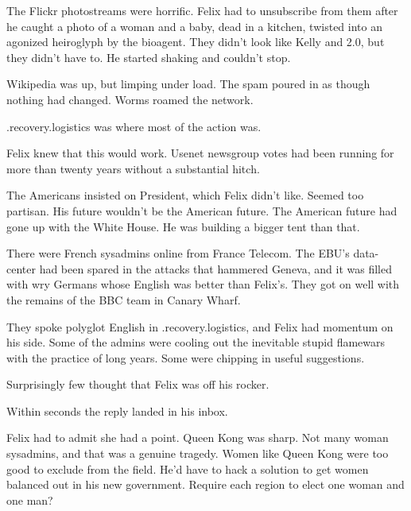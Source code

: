 The Flickr photostreams were horrific. Felix had to unsubscribe
from them after he caught a photo of a woman and a baby, dead in a
kitchen, twisted into an agonized heiroglyph by the bioagent. They
didn’t look like Kelly and 2.0, but they didn’t have to. He started
shaking and couldn’t stop.

Wikipedia was up, but limping under load. The spam poured in as
though nothing had changed. Worms roamed the network.

.recovery.logistics was where most of the action was.

Felix knew that this would work. Usenet newsgroup votes had been
running for more than twenty years without a substantial hitch.

The Americans insisted on President, which Felix didn’t like.
Seemed too partisan. His future wouldn’t be the American future.
The American future had gone up with the White House. He was
building a bigger tent than that.

There were French sysadmins online from France Telecom. The EBU’s
data-center had been spared in the attacks that hammered Geneva,
and it was filled with wry Germans whose English was better than
Felix’s. They got on well with the remains of the BBC team in
Canary Wharf.

They spoke polyglot English in .recovery.logistics, and Felix had
momentum on his side. Some of the admins were cooling out the
inevitable stupid flamewars with the practice of long years. Some
were chipping in useful suggestions.

Surprisingly few thought that Felix was off his rocker.

Within seconds the reply landed in his inbox.

Felix had to admit she had a point. Queen Kong was sharp. Not many
woman sysadmins, and that was a genuine tragedy. Women like Queen
Kong were too good to exclude from the field. He’d have to hack a
solution to get women balanced out in his new government. Require
each region to elect one woman and one man?

